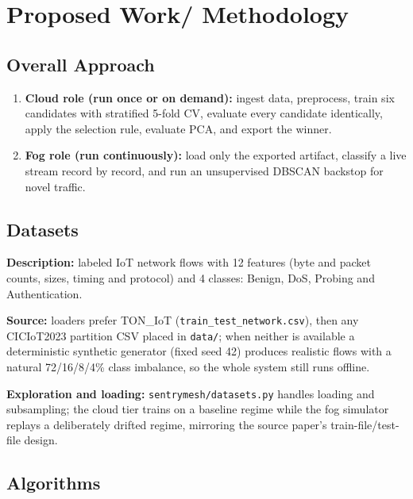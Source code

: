 \documentclass[12pt,a4paper]{article}
\begin{document}
\clearpage
\section{Proposed Work/ Methodology}

\subsection{Overall Approach}
\begin{enumerate}
  \item \textbf{Cloud role (run once or on demand):} ingest data, preprocess, train
        six candidates with stratified 5-fold CV, evaluate every candidate
        identically, apply the selection rule, evaluate PCA, and export the winner.
  \item \textbf{Fog role (run continuously):} load only the exported artifact,
        classify a live stream record by record, and run an unsupervised DBSCAN
        backstop for novel traffic.
\end{enumerate}

\subsection{Datasets}
\textbf{Description:} labeled IoT network flows with 12 features (byte and packet
counts, sizes, timing and protocol) and 4 classes: Benign, DoS, Probing and
Authentication.

\textbf{Source:} loaders prefer TON\_IoT (\texttt{train\_test\_network.csv}), then any
CICIoT2023 partition CSV placed in \texttt{data/}; when neither is available a
deterministic synthetic generator (fixed seed 42) produces realistic flows with a
natural 72/16/8/4\% class imbalance, so the whole system still runs offline.

\textbf{Exploration and loading:} \texttt{sentrymesh/datasets.py} handles loading and
subsampling; the cloud tier trains on a baseline regime while the fog simulator
replays a deliberately drifted regime, mirroring the source paper's
train-file/test-file design.

\subsection{Algorithms}
\end{document}
